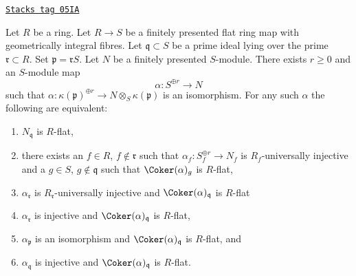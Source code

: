 \begin{lemma}
\label{flat-lemma-induction-step-fp}
\href{https://stacks.math.columbia.edu/tag/05IA}{\texttt{Stacks tag 05IA}}

Let $R$ be a ring. Let $R \to S$ be a finitely presented
flat ring map with geometrically integral fibres. Let
$\mathfrak q \subset S$ be a prime ideal lying over the prime
$\mathfrak r \subset R$. Set $\mathfrak p = \mathfrak r S$.
Let $N$ be a finitely presented $S$-module.
There exists $r \geq 0$ and an $S$-module map
$$
\alpha : S^{\oplus r} \longrightarrow N
$$
such that
$\alpha : \kappa(\mathfrak p)^{\oplus r} \to N \otimes_S \kappa(\mathfrak p)$
is an isomorphism. For any such $\alpha$ the following are equivalent:
\begin{enumerate}
\item $N_{\mathfrak q}$ is $R$-flat,
\item there exists an $f \in R$, $f \not \in \mathfrak r$ such that
$\alpha_f : S_f^{\oplus r} \to N_f$ is $R_f$-universally injective and
a $g \in S$, $g \not \in \mathfrak q$ such that $\Coker(\alpha)_g$
is $R$-flat,
\item $\alpha_{\mathfrak r}$ is $R_{\mathfrak r}$-universally injective and
$\Coker(\alpha)_{\mathfrak q}$ is $R$-flat
\item $\alpha_{\mathfrak r}$ is injective and
$\Coker(\alpha)_{\mathfrak q}$ is $R$-flat,
\item $\alpha_{\mathfrak p}$ is an isomorphism and
$\Coker(\alpha)_{\mathfrak q}$ is $R$-flat, and
\item $\alpha_{\mathfrak q}$ is injective and
$\Coker(\alpha)_{\mathfrak q}$ is $R$-flat.
\end{enumerate}
\end{lemma}

